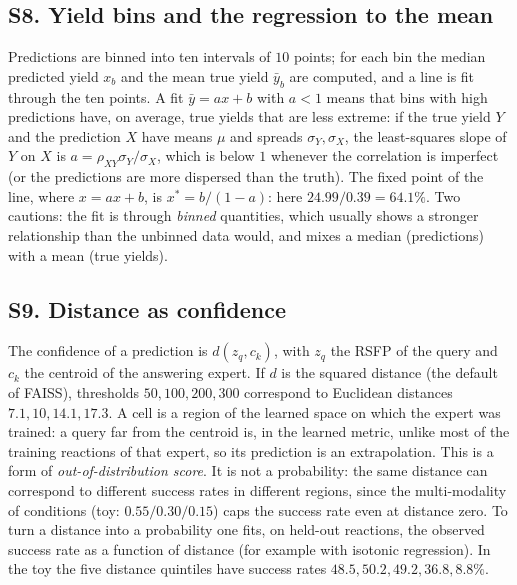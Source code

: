 \documentclass[11pt]{article}
\begin{document}
\subsection*{S8. Yield bins and the regression to the mean}
Predictions are binned into ten intervals of $10$ points; for each bin the median predicted yield $x_b$ and the mean true yield $\bar y_b$ are computed, and a line is fit through the ten points. A fit $\bar y=ax+b$ with $a<1$ means that bins with high predictions have, on average, true yields that are less extreme: if the true yield $Y$ and the prediction $X$ have means $\mu$ and spreads $\sigma_Y,\sigma_X$, the least-squares slope of $Y$ on $X$ is $a=\rho_{XY}\sigma_Y/\sigma_X$, which is below $1$ whenever the correlation is imperfect (or the predictions are more dispersed than the truth). The fixed point of the line, where $x=ax+b$, is $x^\ast=b/(1-a)$: here $24.99/0.39=64.1\%$. Two cautions: the fit is through \emph{binned} quantities, which usually shows a stronger relationship than the unbinned data would, and mixes a median (predictions) with a mean (true yields).

\label{sec:S9}
\subsection*{S9. Distance as confidence}
The confidence of a prediction is $d(z_q,c_k)$, with $z_q$ the RSFP of the query and $c_k$ the centroid of the answering expert. If $d$ is the squared distance (the default of FAISS), thresholds $50,100,200,300$ correspond to Euclidean distances $7.1,10,14.1,17.3$. A cell is a region of the learned space on which the expert was trained: a query far from the centroid is, in the learned metric, unlike most of the training reactions of that expert, so its prediction is an extrapolation. This is a form of \emph{out-of-distribution score}. It is not a probability: the same distance can correspond to different success rates in different regions, since the multi-modality of conditions (toy: $0.55/0.30/0.15$) caps the success rate even at distance zero. To turn a distance into a probability one fits, on held-out reactions, the observed success rate as a function of distance (for example with isotonic regression). In the toy the five distance quintiles have success rates $48.5,50.2,49.2,36.8,8.8\%$.
\end{document}
